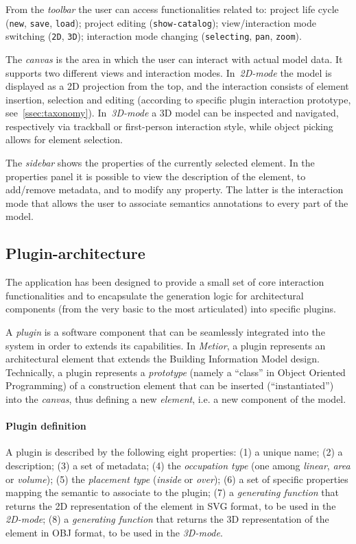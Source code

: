 \documentclass[a4paper,twoside]{article}
\begin{document}
From the \emph{toolbar} the user can access functionalities related to: project life cycle ({\tt new}, {\tt save}, {\tt load}); project editing  ({\tt  show-catalog}); view/interaction mode switching ({\tt 2D}, {\tt  3D}); interaction mode changing ({\tt  selecting}, {\tt pan}, {\tt zoom}).


The \emph{canvas} is the area in which the user can interact with actual model data. It supports two different views and interaction modes. In~\emph{2D-mode} the model is displayed as a 2D projection from the top, and the interaction consists of element insertion, selection and editing (according to specific plugin interaction prototype, see~\ref{ssec:taxonomy}). In~\emph{3D-mode} a 3D model can be inspected and navigated, respectively via trackball or first-person interaction style, while object picking allows for element selection.

The \emph{sidebar} shows the properties of the currently selected element.
In the properties panel it is possible to view the description of the element, to add/remove metadata, and to modify any property. The latter is the interaction mode that allows the user to associate semantics annotations to every part of the model.

\subsection{Plugin-architecture}

\noindent
The application has been designed to provide a small set of core interaction functionalities and to encapsulate the generation logic for architectural components (from the very basic to the most articulated) into specific plugins.

A \emph{plugin} is a software component that can be seamlessly integrated into the system in order to extends its capabilities.
In \emph{Metior}, a plugin represents an architectural element that extends the Building Information Model design.
Technically, a plugin represents a \emph{prototype} (namely a ``class'' in Object Oriented Programming) of a construction element that can be inserted (``instantiated'') into the \emph{canvas}, thus defining a new \emph{element}, i.e. a new component of the model.

\paragraph{Plugin definition}

\noindent
A plugin is described by the following eight properties: (1) a unique name; (2) a description; (3) a set of metadata; (4) the \emph{occupation type} (one among \emph{linear}, \emph{area} or \emph{volume}); (5) the \emph{placement type} (\emph{inside} or \emph{over}); (6) a set of specific properties mapping the semantic to associate to the plugin; (7) a \emph{generating function} that returns the 2D representation of the element in SVG format, to be used in the \emph{2D-mode}; (8) a \emph{generating function} that returns the 3D representation of the element in OBJ format, to be used in the \emph{3D-mode}.
\end{document}
